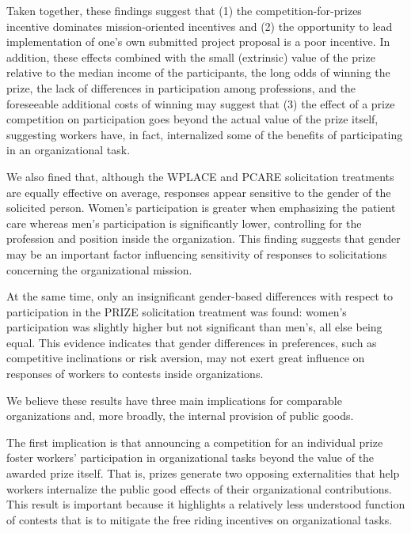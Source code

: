 \documentclass[12pt, titlepage]{article}
\begin{document}
Taken together, these findings suggest that (1) the
competition-for-prizes incentive dominates mission-oriented incentives
and (2) the opportunity to lead implementation of one's own submitted
project proposal is a poor incentive. In addition, these effects
combined with the small (extrinsic) value of the prize relative to the
median income of the participants, the long odds of winning the prize,
the lack of differences in participation among professions, and the
foreseeable additional costs of winning may suggest that (3) the effect
of a prize competition on participation goes beyond the actual value of
the prize itself, suggesting workers have, in fact, internalized some of
the benefits of participating in an organizational task.

We also fined that, although the WPLACE and PCARE solicitation
treatments are equally effective on average, responses appear sensitive
to the gender of the solicited person. Women's participation is greater
when emphasizing the patient care whereas men's participation is
significantly lower, controlling for the profession and position inside
the organization. This finding suggests that gender may be an important
factor influencing sensitivity of responses to solicitations concerning
the organizational mission.

At the same time, only an insignificant gender-based differences with
respect to participation in the PRIZE solicitation treatment was found:
women's participation was slightly higher but not significant than
men's, all else being equal. This evidence indicates that gender
differences in preferences, such as competitive inclinations or risk
aversion, may not exert great influence on responses of workers to
contests inside organizations.

We believe these results have three main implications for comparable
organizations and, more broadly, the internal provision of public goods.

The first implication is that announcing a competition for an individual
prize foster workers' participation in organizational tasks beyond the
value of the awarded prize itself. That is, prizes generate two opposing
externalities that help workers internalize the public good effects of
their organizational contributions. This result is important because it
highlights a relatively less understood function of contests that is to
mitigate the free riding incentives on organizational tasks.
\end{document}
